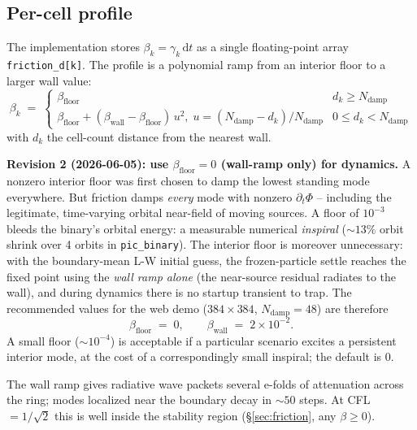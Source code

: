 \documentclass[11pt,a4paper]{article}
\newcommand{\dd}{\mathrm{d}}
\begin{document}
\subsection{Per-cell profile}

The implementation stores $\beta_k = \gamma_k\,\dd t$ as a single
floating-point array \texttt{friction\_d[k]}.  The profile is a
polynomial ramp from an interior floor to a larger wall value:
\begin{equation}
  \beta_k \;=\;
  \begin{cases}
    \beta_\text{floor} & d_k \ge N_\text{damp} \\
    \beta_\text{floor} + (\beta_\text{wall} - \beta_\text{floor})\,u^2,\; u = (N_\text{damp} - d_k)/N_\text{damp} & 0 \le d_k < N_\text{damp}
  \end{cases}
\end{equation}
with $d_k$ the cell-count distance from the nearest wall.

\begin{shaded}
\textbf{Revision 2 (2026-06-05): use $\beta_\text{floor} = 0$ (wall-ramp
only) for dynamics.}  A nonzero interior floor was first chosen to damp
the lowest standing mode everywhere.  But friction damps \emph{every}
mode with nonzero $\partial_t\Phi$ -- including the legitimate,
time-varying orbital near-field of moving sources.  A floor of $10^{-3}$
bleeds the binary's orbital energy: a measurable numerical
\emph{inspiral} ($\sim 13\%$ orbit shrink over 4 orbits in
\texttt{pic\_binary}).  The interior floor is moreover unnecessary: with
the boundary-mean L-W initial guess, the frozen-particle settle reaches
the fixed point using the \emph{wall ramp alone} (the near-source
residual radiates to the wall), and during dynamics there is no startup
transient to trap.  The recommended values for the web demo
($384\times384$, $N_\text{damp}=48$) are therefore
\begin{equation}
  \beta_\text{floor} \;=\; 0, \qquad \beta_\text{wall} \;=\; 2\times10^{-2}.
\end{equation}
A small floor ($\sim 10^{-4}$) is acceptable if a particular scenario
excites a persistent interior mode, at the cost of a correspondingly
small inspiral; the default is $0$.
\end{shaded}

The wall ramp gives radiative wave packets several e-folds of
attenuation across the ring; modes localized near the boundary decay in
$\sim 50$ steps.  At CFL $= 1/\sqrt{2}$ this is well inside the
stability region (\S\ref{sec:friction}, any $\beta \ge 0$).
\end{document}
